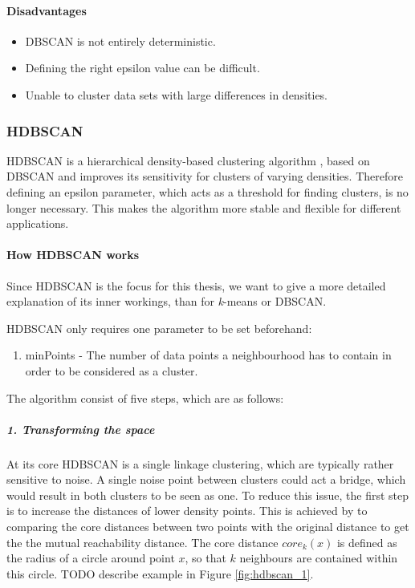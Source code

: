 \paragraph{Disadvantages}
\begin{itemize}
    \item DBSCAN is not entirely deterministic.
    \item Defining the right epsilon value can be difficult.
    \item Unable to cluster data sets with large differences in densities.
\end{itemize}

\subsubsection{HDBSCAN}

HDBSCAN is a hierarchical density-based clustering algorithm \cite{McInnes2017}, based on DBSCAN and improves its sensitivity for clusters of varying densities. Therefore defining an epsilon parameter, which acts as a threshold for finding clusters, is no longer necessary. This makes the algorithm more stable and flexible for different applications. 


\paragraph{How HDBSCAN works}


Since HDBSCAN is the focus for this thesis, we want to give a more detailed explanation of its inner workings, than for \textit{k}-means or DBSCAN.

HDBSCAN only requires one parameter to be set beforehand:
\begin{enumerate}
    \item minPoints - The number of data points a neighbourhood has to contain in order to be considered as a cluster.
\end{enumerate}

The algorithm consist of five steps, which are as follows: 

\subparagraph{1. Transforming the space}

At its core HDBSCAN is a single linkage clustering, which are typically rather sensitive to noise. A single noise point between clusters could act a bridge, which would result in both clusters to be seen as one. To reduce this issue, the first step is to increase the distances of lower density points. This is achieved by to comparing the core distances between two points with the original distance to get the the mutual reachability distance. The core distance $core_k(x)$ is defined as the radius of a circle around point $x$, so that $k$ neighbours are contained within this circle. TODO describe example in Figure \ref{fig:hdbscan_1}. 

